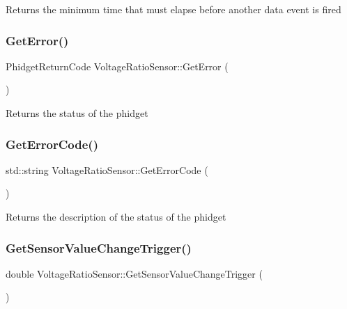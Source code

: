 Returns the minimum time that must elapse before another data event is fired\mbox{\label{classVoltageRatioSensor_ad5d715d963835a920e0ad89786f31899}} 
\subsubsection{\texorpdfstring{Get\+Error()}{GetError()}}
{\footnotesize\ttfamily Phidget\+Return\+Code Voltage\+Ratio\+Sensor\+::\+Get\+Error (\begin{DoxyParamCaption}{ }\end{DoxyParamCaption})\hspace{0.3cm}{\ttfamily [inline]}}

Returns the status of the phidget\mbox{\label{classVoltageRatioSensor_ae30a69afe93b91dd21735bec89ee1dce}} 
\subsubsection{\texorpdfstring{Get\+Error\+Code()}{GetErrorCode()}}
{\footnotesize\ttfamily std\+::string Voltage\+Ratio\+Sensor\+::\+Get\+Error\+Code (\begin{DoxyParamCaption}{ }\end{DoxyParamCaption})\hspace{0.3cm}{\ttfamily [inline]}}

Returns the description of the status of the phidget\mbox{\label{classVoltageRatioSensor_a9da4e001a5276d5058c765b394a98c36}} 
\subsubsection{\texorpdfstring{Get\+Sensor\+Value\+Change\+Trigger()}{GetSensorValueChangeTrigger()}}
{\footnotesize\ttfamily double Voltage\+Ratio\+Sensor\+::\+Get\+Sensor\+Value\+Change\+Trigger (\begin{DoxyParamCaption}{ }\end{DoxyParamCaption})\hspace{0.3cm}{\ttfamily [inline]}}

